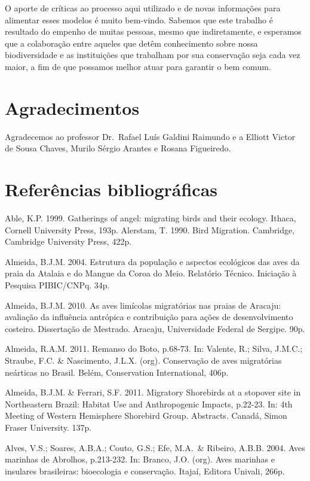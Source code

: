 \documentclass[
  oneside]{scrbook}
\begin{document}
O aporte de críticas ao processo aqui utilizado e de novas informações para alimentar esses modelos é muito bem-vindo. Sabemos que este trabalho é resultado do empenho de muitas pessoas, mesmo que indiretamente, e esperamos que a colaboração entre aqueles que detêm conhecimento sobre nossa biodiversidade e as instituições que trabalham por sua conservação seja cada vez maior, a fim de que possamos melhor atuar para garantir o bem comum.

\hypertarget{agradecimentos}{%
\section{Agradecimentos}\label{agradecimentos}}

Agradecemos ao professor Dr.~Rafael Luís Galdini Raimundo e a Elliott Victor de Sousa Chaves, Murilo Sérgio Arantes e Rosana Figueiredo.

\hypertarget{referencias}{%
\section{Referências bibliográficas}\label{referencias}}

Able, K.P. 1999. Gatherings of angel: migrating birds and their ecology. Ithaca, Cornell University Press, 193p.
Alerstam, T. 1990. Bird Migration. Cambridge, Cambridge University Press, 422p.

Almeida, B.J.M. 2004. Estrutura da população e aspectos ecológicos das aves da praia da Atalaia e do Mangue da Coroa do Meio. Relatório Técnico. Iniciação à Pesquisa PIBIC/CNPq. 34p.

Almeida, B.J.M. 2010. As aves limícolas migratórias nas praias de Aracaju: avaliação da influência antrópica e contribuição para ações de desenvolvimento costeiro. Dissertação de Mestrado. Aracaju, Universidade Federal de Sergipe. 90p.

Almeida, R.A.M. 2011. Remanso do Boto, p.68-73. In: Valente, R.; Silva, J.M.C.; Straube, F.C. \& Nascimento, J.L.X. (org). Conservação de aves migratórias neárticas no Brasil. Belém, Conservation International, 406p.

Almeida, B.J.M. \& Ferrari, S.F. 2011. Migratory Shorebirds at a stopover site in Northeastern Brazil: Habitat Use and Anthropogenic Impacts, p.22-23. In: 4th Meeting of Western Hemisphere Shorebird Group. Abstracts. Canadá, Simon Fraser University. 137p.

Alves, V.S.; Soares, A.B.A.; Couto, G.S.; Efe, M.A.~\& Ribeiro, A.B.B. 2004. Aves marinhas de Abrolhos, p.213-232. In: Branco, J.O. (org). Aves marinhas e insulares brasileiras: bioecologia e conservação. Itajaí, Editora Univali, 266p.
\end{document}
